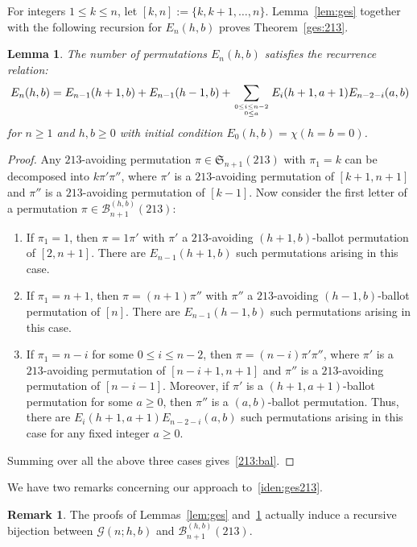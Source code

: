 \documentclass[12pt]{amsart}
\numberwithin{equation}{section}
\theoremstyle{plain}
\newtheorem{lemma}[theorem]{Lemma}
\theoremstyle{definition}
\newtheorem{remark}[theorem]{Remark}
\newcommand{\B}{\mathcal{B}}
\newcommand{\G}{\mathcal{G}}
\def\S{\mathfrak{S}}
\begin{document}
For integers $1\leq k\leq n$, let $[k,n]:=\{k,k+1,\ldots,n\}$. Lemma~\ref{lem:ges} together with the following recursion for $E_n(h,b)$ proves Theorem~\ref{ges:213}. 
\begin{lemma}\label{lema:213}
The number of permutations  $E_n(h,b)$ satisfies the recurrence relation:
\begin{equation}\label{213:bal}
E_n(h,b)=E_{n-1}(h+1,b)+E_{n-1}(h-1,b)+\sum_{0\leq i\leq n-2\atop{0\leq a}}E_i(h+1,a+1)E_{n-2-i}(a,b)
\end{equation}
for $n\geq1$ and $h,b\geq0$ with initial condition $E_0(h,b)=\chi(h=b=0)$.
\end{lemma}
\begin{proof}
Any $213$-avoiding permutation $\pi\in\S_{n+1}(213)$ with $\pi_1=k$ can be decomposed into $k\pi'\pi''$, where $\pi'$ is a $213$-avoiding permutation of $[k+1,n+1]$ and $\pi''$ is a $213$-avoiding permutation of $[k-1]$. Now consider the first letter of a permutation $\pi\in\B_{n+1}^{(h,b)}(213)$:
\begin{enumerate}
\item If $\pi_1=1$, then $\pi=1\pi'$ with $\pi'$ a $213$-avoiding $(h+1,b)$-ballot permutation of  $[2,n+1]$. There are $E_{n-1}(h+1,b)$ such permutations arising in this case. 
\item If $\pi_1=n+1$, then $\pi=(n+1)\pi''$ with $\pi''$ a $213$-avoiding $(h-1,b)$-ballot permutation of  $[n]$. There are $E_{n-1}(h-1,b)$ such permutations arising in this case. 
\item If $\pi_1=n-i$ for some $0\leq i\leq n-2$, then $\pi=(n-i)\pi'\pi''$, where $\pi'$  is a $213$-avoiding permutation of $[n-i+1,n+1]$ and $\pi''$ is a $213$-avoiding permutation of $[n-i-1]$. Moreover, if $\pi'$ is a $(h+1,a+1)$-ballot permutation for some $a\geq0$, then $\pi''$ is a $(a,b)$-ballot permutation. Thus, there are $E_{i}(h+1,a+1)E_{n-2-i}(a,b)$ such permutations arising in this case for any fixed integer $a\geq0$. 
\end{enumerate}
Summing over all the above three cases gives~\eqref{213:bal}. 
\end{proof}

We have two remarks concerning our approach to~\eqref{iden:ges213}.  
\begin{remark}
The proofs of Lemmas~\ref{lem:ges} and~\ref{lema:213} actually  induce a recursive bijection between $\G(n;h,b)$ and $\B_{n+1}^{(h,b)}(213)$. 
\end{remark}
\end{document}
